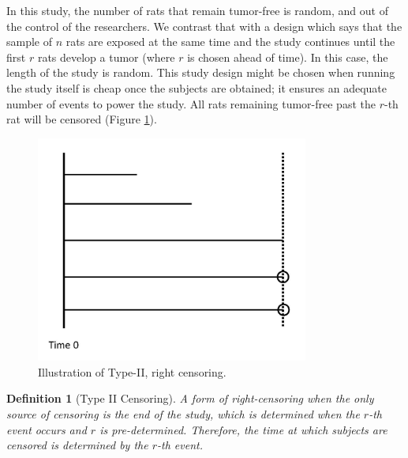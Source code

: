 \documentclass[
]{book}
\theoremstyle{plain}
\theoremstyle{mydefn}
\newtheorem{definition}{Definition}[chapter]
\theoremstyle{myexmpl}
\theoremstyle{remark}
\begin{document}
In this study, the number of rats that remain tumor-free is random, and out of the control of the researchers. We contrast that with a design which says that the sample of \(n\) rats are exposed at the same time and the study continues until the first \(r\) rats develop a tumor (where \(r\) is chosen ahead of time). In this case, the length of the study is random. This study design might be chosen when running the study itself is cheap once the subjects are obtained; it ensures an adequate number of events to power the study. All rats remaining tumor-free past the \(r\)-th rat will be censored (Figure \ref{fig:surv-censoring-type-2}).

\begin{figure}

{\centering \includegraphics[width=0.8\textwidth]{images/censoring-type-2} 

}

\caption{Illustration of Type-II, right censoring.}\label{fig:surv-censoring-type-2}
\end{figure}

\begin{definition}[Type II Censoring]
A form of right-censoring when the only source of censoring is the end of the study, which is determined when the \(r\)-th event occurs and \(r\) is pre-determined. Therefore, the time at which subjects are censored is determined by the \(r\)-th event.
\end{definition}
\end{document}
